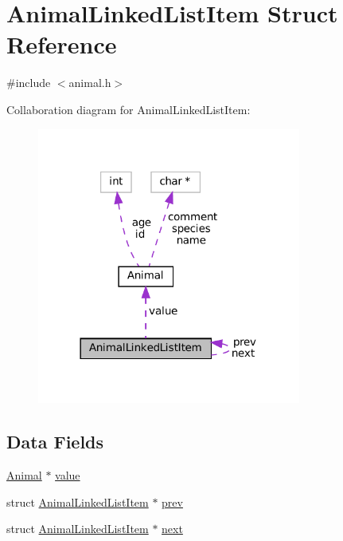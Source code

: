 \hypertarget{struct_animal_linked_list_item}{}\section{Animal\+Linked\+List\+Item Struct Reference}
\label{struct_animal_linked_list_item}


{\ttfamily \#include $<$animal.\+h$>$}



Collaboration diagram for Animal\+Linked\+List\+Item\+:
\nopagebreak
\begin{figure}[H]
\begin{center}
\leavevmode
\includegraphics[width=246pt]{struct_animal_linked_list_item__coll__graph}
\end{center}
\end{figure}
\subsection*{Data Fields}
\begin{DoxyCompactItemize}
\item 
\mbox{\hyperlink{struct_animal}{Animal}} $\ast$ \mbox{\hyperlink{struct_animal_linked_list_item_a6beaaaa5100f3f9f3cb09b5746208047}{value}}
\item 
struct \mbox{\hyperlink{struct_animal_linked_list_item}{Animal\+Linked\+List\+Item}} $\ast$ \mbox{\hyperlink{struct_animal_linked_list_item_ae9af6eb05ab6a7b59e2ad01ded9873bd}{prev}}
\item 
struct \mbox{\hyperlink{struct_animal_linked_list_item}{Animal\+Linked\+List\+Item}} $\ast$ \mbox{\hyperlink{struct_animal_linked_list_item_a06cafc1028de611d48fcbe0ead6317ad}{next}}
\end{DoxyCompactItemize}


